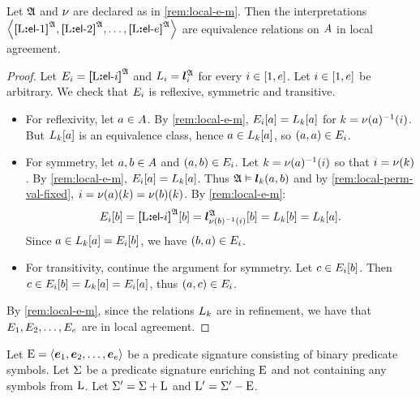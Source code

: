 \begin{remark}\label{rem:local-e-local}
Let $\mathfrak{A}$ and $\nu$ are declared as in \cref{rem:local-e-m}.
Then the interpretations
$\left\langle {\bm{[}\mathrm{L}\mathord{\bm{:}}\mathsf{el}{\hbox{-}}1\bm{]}}^{\mathfrak{A}},{\bm{[}\mathrm{L}\mathord{\bm{:}}\mathsf{el}{\hbox{-}}2\bm{]}}^{\mathfrak{A}},\dots,{\bm{[}\mathrm{L}\mathord{\bm{:}}\mathsf{el}{\hbox{-}}e\bm{]}}^{\mathfrak{A}} \right\rangle$ are
equivalence relations on $A$ in local agreement.
\end{remark}
\begin{proof}
Let $E_{i} = {\bm{[}\mathrm{L}\mathord{\bm{:}}\mathsf{el}{\hbox{-}}i\bm{]}}^{\mathfrak{A}}$ and $L_{i} = \bm{l}_{i}^{\mathfrak{A}}$ for
every $i \in [1,e]$.
Let $i \in [1,e]$ be arbitrary.
We check that $E_{i}$ is reflexive, symmetric and transitive.
\begin{itemize}
  \item For reflexivity, let $a \in A$.
  By \cref{rem:local-e-m},
  $E_{i}[a] = L_{k}[a]$ for $k = \nu(a)^{-1}(i)$. 
  But $L_{k}[a]$ is an equivalence class, hence $a \in L_{k}[a]$,
  so $(a,a) \in E_{i}$.

  \item For symmetry, let $a, b \in A$ and $(a,b) \in E_{i}$.
  Let $k = \nu(a)^{-1}(i)$ so that $i = \nu(k)$.
  By \cref{rem:local-e-m}, $E_{i}[a] = L_{k}[a]$.
  Thus $\mathfrak{A} \vDash \bm{l}_{k}(a,b)$ and by
  \cref{rem:local-perm-val-fixed}, $i = \nu(a)(k) =
  \nu(b)(k)$.
  By \cref{rem:local-e-m}:
  \[
    E_{i}[b] =
    {\bm{[}\mathrm{L}\mathord{\bm{:}}\mathsf{el}{\hbox{-}}i\bm{]}}^{\mathfrak{A}}[b] =
    \bm{l}_{\nu(b)^{-1}(i)}^{\mathfrak{A}}[b] =
    L_{k}[b] = L_{k}[a].
  \]
  Since $a \in L_{k}[a] = E_{i}[b]$, we have $(b,a) \in
  E_{i}$.
   
  \item For transitivity, continue the argument for symmetry.
  Let $c \in E_{i}[b]$.
  Then $c \in E_{i}[b] = L_{k}[a] = E_{i}[a]$,
  thus $(a,c) \in E_{i}$.
\end{itemize}
By \cref{rem:local-e-m}, since the relations $L_{k}$ are in refinement, we
have that $E_{1}, E_{2}, \dots, E_{e}$ are in local agreement.
\end{proof}

Let $\mathrm{E} = \left\langle \bm{e}_{1},\bm{e}_{2},\dots,\bm{e}_{e} \right\rangle$ be a predicate signature consisting
of binary predicate symbols.
Let $\mathrm{\Sigma}$ be a predicate signature enriching $\mathrm{E}$
and not containing any symbols from $\mathrm{L}$. 
Let $\mathrm{\Sigma'} = \mathrm{\Sigma} + \mathrm{L}$ and ${\mathrm{L}'} = \mathrm{\Sigma'} - \mathrm{E}$.

